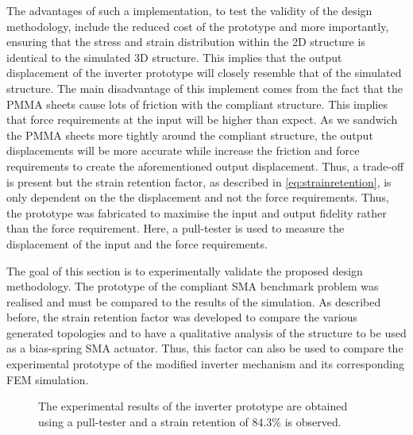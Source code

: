The advantages of such a implementation, to test the validity of the design methodology, include the reduced cost of the prototype and more importantly, ensuring that the stress and strain distribution within the 2D structure is identical to the simulated 3D structure. This implies that the output displacement of the inverter prototype will closely resemble that of the simulated structure. The main disadvantage of this implement comes from the fact that the PMMA sheets cause lots of friction with the compliant structure. This implies that force requirements at the input will be higher than expect. As we sandwich the PMMA sheets more tightly around the compliant structure, the output displacements will be more accurate while increase the friction and force requirements to create the aforementioned output displacement. Thus, a trade-off is present but the strain retention factor, as described in \cref{eq:strainretention}, is only dependent on the the displacement and not the force requirements. Thus, the prototype was fabricated to maximise the input and output fidelity rather than the force requirement. Here, a pull-tester is used to measure the displacement of the input and the force requirements.

The goal of this section is to experimentally validate the proposed design methodology. The prototype of the compliant SMA benchmark problem was realised and must be compared to the results of the simulation. As described before, the strain retention factor was developed to compare the various generated topologies and to have a qualitative analysis of the structure to be used as a bias-spring SMA actuator. Thus, this factor can also be used to compare the experimental prototype of the modified inverter mechanism and its corresponding FEM simulation.

\begin{figure}[hbt!]
    \centering
    \resizebox{0.85\textwidth}{!}{}
    \caption{The experimental results of the inverter prototype are obtained using a pull-tester and a strain retention of 84.3\% is observed.}
    \label{fig:results-proto-inverter}
\end{figure}%


